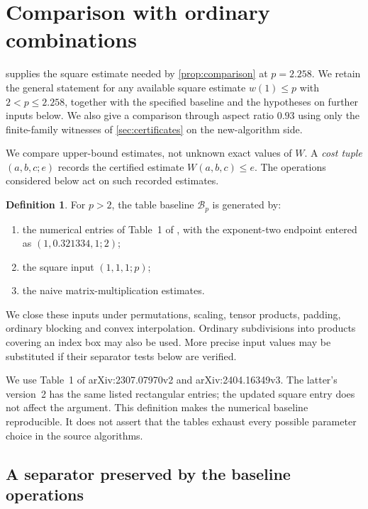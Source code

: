 \documentclass[11pt]{article}
\numberwithin{equation}{section}
\theoremstyle{definition}
\newtheorem{definition}[theorem]{Definition}
\theoremstyle{remark}
\begin{document}
\section{Comparison with ordinary combinations}\label{sec:comparison}

 supplies the square estimate needed by
\cref{prop:comparison} at \(p=2.258\).
We retain the general statement for any available square estimate
\(w(1)\le p\) with \(2<p\le2.258\), together with the specified
baseline and the hypotheses on further inputs below.
We also give a comparison through aspect ratio \(0.93\) using only
the finite-family witnesses of \cref{sec:certificates} on the
new-algorithm side.

We compare upper-bound estimates, not unknown exact values of \(W\).
A \emph{cost tuple} \((a,b,c;e)\) records the certified estimate
\(W(a,b,c)\le e\).
The operations considered below act on such recorded estimates.

\begin{definition}\label{def:baseline}
For \(p>2\), the table baseline \(\mathcal B_p\) is generated by:
\begin{enumerate}
 \item the numerical entries of Table~1 of \cite{vxxz,advxxz}, with the
 exponent-two endpoint entered as \((1,0.321334,1;2)\);
 \item the square input \((1,1,1;p)\);
 \item the naive matrix-multiplication estimates.
\end{enumerate}
We close these inputs under permutations, scaling, tensor products,
padding, ordinary blocking and convex interpolation.
Ordinary subdivisions into products covering an index box may also
be used.
More precise input values may be substituted if their separator tests
below are verified.
\end{definition}

We use Table~1 of arXiv:2307.07970v2 and arXiv:2404.16349v3.
The latter's version~2 has the same listed rectangular entries;
the updated square entry does not affect the argument.
This definition makes the numerical baseline reproducible.
It does not assert that the tables exhaust every possible parameter
choice in the source algorithms.

\subsection{A separator preserved by the baseline operations}
\end{document}
